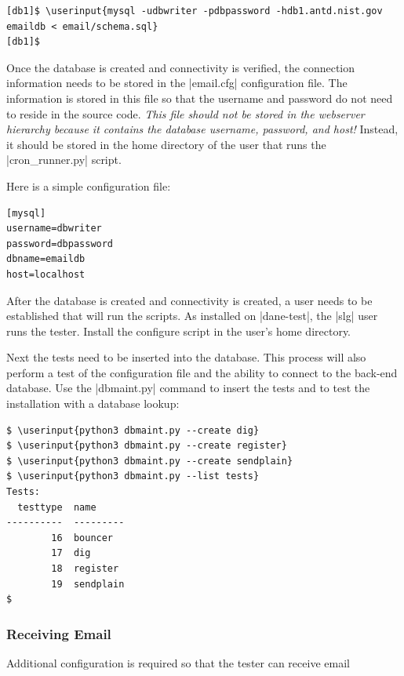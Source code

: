 \documentclass[preprint,3p]{elsarticle}
\newcommand\userinput[1]{\textbf{#1}}
\begin{document}
\begin{Verbatim}[commandchars=\\\{\}]
[db1]$ \userinput{mysql -udbwriter -pdbpassword -hdb1.antd.nist.gov emaildb < email/schema.sql}
[db1]$
\end{Verbatim}

Once the database is created and connectivity is verified, the
connection information needs to be stored in the 
|email.cfg| configuration file. The information is stored in this file
so that the username and password do not need to reside in the source
code. \emph{This file should not be stored in the webserver
  hierarchy because it contains the database username, password, and
  host!} Instead, it should be stored in the home directory of the
user that runs the |cron_runner.py| script.

Here is a simple configuration file:

\begin{lstlisting}
[mysql]
username=dbwriter
password=dbpassword
dbname=emaildb
host=localhost
\end{lstlisting}

After the database is created and connectivity is created, a user
needs to be established that will run the scripts. As installed on
|dane-test|, the |slg| user runs the tester.   Install the configure
script in the user's home directory.

Next the tests need to be inserted into the database. This process
will also perform a test of the configuration file and the ability to
connect to the back-end database. Use the |dbmaint.py| command to
insert the tests and to test the installation with a database lookup:

\begin{Verbatim}[commandchars=\\\{\}]
$ \userinput{python3 dbmaint.py --create dig}
$ \userinput{python3 dbmaint.py --create register}
$ \userinput{python3 dbmaint.py --create sendplain}
$ \userinput{python3 dbmaint.py --list tests}
Tests:
  testtype  name
----------  ---------
        16  bouncer
        17  dig
        18  register
        19  sendplain
$
\end{Verbatim}

\subsubsection{Receiving Email}

Additional configuration is required so that the tester can receive email
\end{document}
